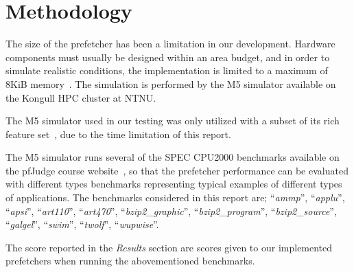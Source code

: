 \section{Methodology}

The size of the prefetcher has been a limitation in our development. Hardware
components must usually be designed within an area budget, and in order to
simulate realistic conditions, the implementation is limited to a maximum of
8KiB memory~\cite{guidelines}. The simulation is performed by the M5 simulator
available on the Kongull HPC cluster at NTNU.

The M5 simulator used in our testing was only utilized with a subset of its rich
feature set~\cite{user_doc}, due to the time limitation of this report.



The M5 simulator runs several of the SPEC CPU2000 benchmarks available on the
pfJudge course website~\cite{guidelines}, so that the prefetcher performance can
be evaluated with different types benchmarks representing typical examples of
different types of applications. The benchmarks considered in this report are;
``\emph{ammp}'', ``\emph{applu}'', ``\emph{apsi}'', ``\emph{art110}'',
``\emph{art470}'', ``\emph{bzip2\_graphic}'', ``\emph{bzip2\_program}'',
``\emph{bzip2\_source}'', ``\emph{galgel}'', ``\emph{swim}'', ``\emph{twolf}'',
``\emph{wupwise}''.


The score reported in the \textit{Results} section are scores given to our
implemented prefetchers when running the abovementioned benchmarks.

